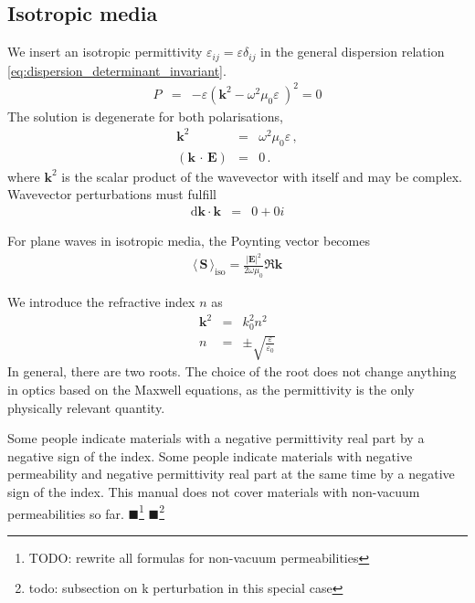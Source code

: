 \documentclass[12pt,a4paper,twoside,openright,BCOR10mm,headsepline,titlepage,abstracton,chapterprefix,final]{scrreprt}
\newcommand\Vector[1]{{\mathbf{#1}}}
\newcommand\vacuum{0}
\newcommand\wavenumber{k}
\newcommand\Wavevector{\Vector{\wavenumber}}
\newcommand{\scpm}[2]{(#1\,\cdot\,#2)}
\newcommand\scalarEfield{E}
\newcommand\Efield{\Vector{\scalarEfield}}
\newcommand\vacuumpermeability{\scalarpermeability_{\vacuum}}
\newcommand\scalarpermeability{\mu}
\newcommand\vacuumpermittivity{\scalarpermittivity_{\vacuum}}
\newcommand\scalarpermittivity{\varepsilon}
\newcommand{\timeavg}[1]{{\langle\,#1\,\rangle}}
\newcommand{\remark}[1]{{\color{red}$\blacksquare$}\footnote{{\color{red}#1}}}
\newcommand\totald{\textrm{d}}
\begin{document}
\subsection{Isotropic media}
We insert an isotropic permittivity $\scalarpermittivity_{ij} = \scalarpermittivity \delta_{ij}$ 
in the general dispersion relation \eqref{eq:dispersion_determinant_invariant}.
\begin{eqnarray}
 P &=& -\scalarpermittivity 
       \left( 
         \Wavevector^2 - \omega^2 \vacuumpermeability \scalarpermittivity\
       \right)^2
    = 0
\end{eqnarray}
The solution is degenerate for both polarisations,
\begin{eqnarray}
 \Wavevector^2 &=& \omega^2 \vacuumpermeability \scalarpermittivity\,, \\
 \scpm{\Wavevector}{\Efield} &=& 0\,.
\end{eqnarray}
where $\Wavevector^2$ is the scalar product of the wavevector with itself and may be complex.
Wavevector perturbations must fulfill
\begin{eqnarray}
 \totald\Wavevector \cdot \Wavevector &=& 0 + 0i
\end{eqnarray}

For plane waves in isotropic media, the Poynting vector becomes 
\begin{eqnarray}
 \timeavg{\Vector{S}}_\text{iso} = \frac{ |\Efield|^2 }{ 2\omega\vacuumpermeability } \Re \Wavevector
\end{eqnarray}

We introduce the refractive index $n$ as
\begin{eqnarray}
 \Wavevector^2 &=& k_0^2 n^2 \\
 n &=& \pm \sqrt{ \frac{\scalarpermittivity}{\vacuumpermittivity} }
\end{eqnarray}
In general, there are two roots. 
The choice of the root does not change anything in optics based on the Maxwell equations, as the permittivity is the only physically relevant quantity.

Some people indicate materials with a negative permittivity real part by a negative sign of the index.
Some people indicate materials with negative permeability and negative permittivity real part at the same time by a negative sign of the index.
This manual does not cover materials with non-vacuum permeabilities so far.
\remark{TODO: rewrite all formulas for non-vacuum permeabilities}
\remark{todo: subsection on k perturbation in this special case}
\end{document}

